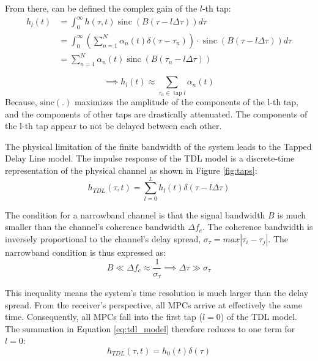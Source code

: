 From there, can be defined the complex gain of the $l$-th tap:
\begin{align}
	h_l(t) &= \int_0^{\infty} h(\tau, t) \operatorname{sinc}(B(\tau-l \Delta \tau)) d \tau \\
	&= \int_0^{\infty} (\sum_{n=1}^{N} \alpha_n(t) \delta(\tau - \tau_n)) \cdot \operatorname{sinc}(B(\tau-l \Delta \tau)) d \tau \\
	 &= \sum_{n=1}^N \alpha_n(t) \operatorname{sinc}\left(B\left(\tau_n-l \Delta \tau\right)\right)
\end{align}

\begin{equation}
	\implies \boxed{h_l(t) \approx \sum_{\tau_n \in \operatorname{tap} l} \alpha_n(t)} 
\end{equation}
Because, $\operatorname{sinc(.)}$ maximizes the amplitude of the components of the  l-th tap, and the components of other taps are drastically attenuated. The components of the l-th tap appear to not be delayed between each other.

The physical limitation of the finite bandwidth of the system leads to the Tapped Delay Line model. The impulse response of the TDL model is a discrete-time representation of the physical channel as shown in Figure \ref{fig:taps}:
\begin{equation}
	h_{TDL}(\tau, t) = \sum_{l=0}^{L} h_l(t) \delta(\tau - l\Delta\tau)
	\label{eq:tdl_model}
\end{equation}


The condition for a narrowband channel is that the signal bandwidth $B$ is much smaller than the channel's coherence bandwidth $\Delta f_c$. The coherence bandwidth is inversely proportional to the channel's delay spread, $\sigma_\tau = max|\tau_i - \tau_j|$. The narrowband condition is thus expressed as:
\begin{equation}
	B \ll \Delta f_c \approx \frac{1}{\sigma_\tau} \implies \Delta\tau \gg \sigma_\tau
\end{equation}

This inequality means the system's time resolution is much larger than the delay spread. From the receiver's perspective, all MPCs arrive at effectively the same time. Consequently, all MPCs fall into the first tap ($l=0$) of the TDL model. The summation in Equation \ref{eq:tdl_model} therefore reduces to one term for $l=0$:
\begin{equation}
	\label{eq:tdl-narrow}
	h_{TDL}(\tau, t) = h_0(t) \delta(\tau)
\end{equation}

